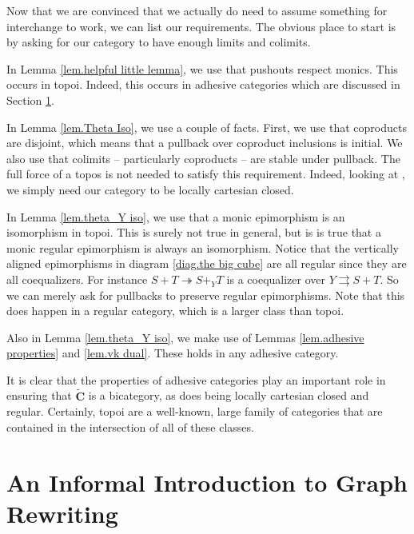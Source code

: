 \documentclass[11pt]{amsart}
\newcommand{\csC}{\widetilde{\mathbf{C}}}
\theoremstyle{remark}
\theoremstyle{definition}
\begin{document}
Now that we are convinced that we actually do need to assume something for interchange to work, we can list our requirements.  The obvious place to start is by asking for our category to have enough limits and colimits.  

In Lemma \ref{lem.helpful little lemma}, we use that pushouts respect monics.  This occurs in topoi. Indeed, this occurs in adhesive categories which are discussed in Section \ref{sec.Rewriting}.  

In Lemma \ref{lem.Theta Iso}, we use a couple of facts.  First, we use that coproducts are disjoint, which means that a pullback over coproduct inclusions is initial. We also use that colimits -- particularly coproducts -- are stable under pullback.  The full force of a topos is not needed to satisfy this requirement.  Indeed, looking at \cite[Thm.~1.4.9]{MacLaneMoerdijk_SheavesGeomLogic}, we simply need our category to be locally cartesian closed.  

In Lemma \ref{lem.theta_Y iso}, we use that a monic epimorphism is an isomorphism in topoi. This is surely not true in general, but is is true that a monic regular epimorphism is always an isomorphism.  Notice that the vertically aligned epimorphisms in diagram \eqref{diag.the big cube} are all regular since they are all coequalizers. For instance $S+T \twoheadrightarrow S+_YT$ is a coequalizer over $Y \rightrightarrows S+T$.  So we can merely ask for pullbacks to preserve regular epimorphisms. Note that this does happen in a regular category, which is a larger class than topoi.   

Also in Lemma \ref{lem.theta_Y iso}, we make use of Lemmas \ref{lem.adhesive properties} and \ref{lem.vk dual}.  These holds in any adhesive category. 

It is clear that the properties of adhesive categories play an important role in ensuring that $\csC$ is a bicategory, as does being locally cartesian closed and regular.  Certainly, topoi are a well-known, large family of categories that are contained in the intersection of all of these classes. 
%
%
%
%
%
%
%
%
%
%
%
%
%
%
%
%
%
%
%
\section{An Informal Introduction to Graph Rewriting}  %
\label{sec.Rewriting}
%
\end{document}
